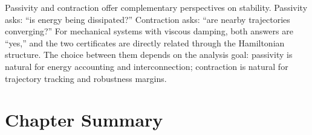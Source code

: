 \begin{intuitionbox}
Passivity and contraction offer complementary perspectives on stability. Passivity
asks: ``is energy being dissipated?'' Contraction asks: ``are nearby trajectories
converging?'' For mechanical systems with viscous damping, both answers are ``yes,''
and the two certificates are directly related through the Hamiltonian structure.
The choice between them depends on the analysis goal: passivity is natural for
energy accounting and interconnection; contraction is natural for trajectory tracking
and robustness margins.
\end{intuitionbox}


\section{Chapter Summary}

